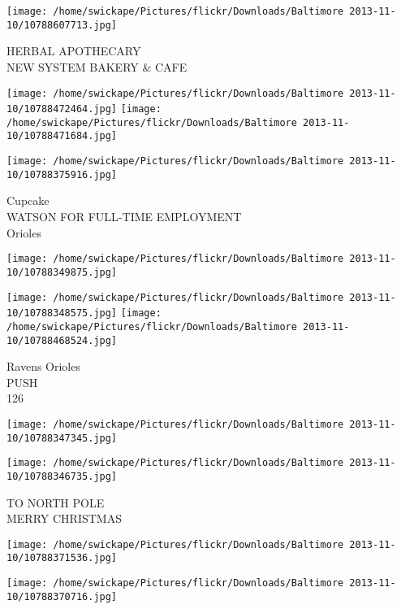 \documentclass[10pt,letterpaper]{article}
\begin{document}
\vspace{0.25in}
\texttt{[image: /home/swickape/Pictures/flickr/Downloads/Baltimore 2013-11-10/10788607713.jpg]}

HERBAL APOTHECARY\\
NEW SYSTEM BAKERY \& CAFE\\
\pagebreak

\texttt{[image: /home/swickape/Pictures/flickr/Downloads/Baltimore 2013-11-10/10788472464.jpg]}
\texttt{[image: /home/swickape/Pictures/flickr/Downloads/Baltimore 2013-11-10/10788471684.jpg]}

\texttt{[image: /home/swickape/Pictures/flickr/Downloads/Baltimore 2013-11-10/10788375916.jpg]}

Cupcake\\
WATSON FOR FULL{-}TIME EMPLOYMENT\\
Orioles\\
\pagebreak

\texttt{[image: /home/swickape/Pictures/flickr/Downloads/Baltimore 2013-11-10/10788349875.jpg]}

\vspace{0.25in}
\texttt{[image: /home/swickape/Pictures/flickr/Downloads/Baltimore 2013-11-10/10788348575.jpg]}
\texttt{[image: /home/swickape/Pictures/flickr/Downloads/Baltimore 2013-11-10/10788468524.jpg]}

Ravens Orioles\\
PUSH\\
126\\
\pagebreak

\texttt{[image: /home/swickape/Pictures/flickr/Downloads/Baltimore 2013-11-10/10788347345.jpg]}

\vspace{0.25in}
\texttt{[image: /home/swickape/Pictures/flickr/Downloads/Baltimore 2013-11-10/10788346735.jpg]}

TO NORTH POLE\\
MERRY CHRISTMAS\\
\pagebreak

\texttt{[image: /home/swickape/Pictures/flickr/Downloads/Baltimore 2013-11-10/10788371536.jpg]}

\vspace{0.25in}
\texttt{[image: /home/swickape/Pictures/flickr/Downloads/Baltimore 2013-11-10/10788370716.jpg]}
\end{document}
